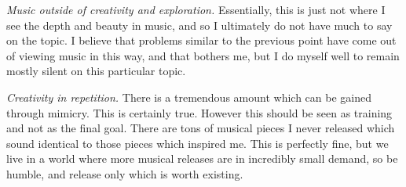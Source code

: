 \documentclass[12pt]{book}
\theoremstyle{plain}
\theoremstyle{definition}
\begin{document}
\emph{Music outside of creativity and exploration.} Essentially, this is just not where I see the depth and beauty in music, and so I ultimately do not have much to say on the topic. I believe that problems similar to the previous point have come out of viewing music in this way, and that bothers me, but I do myself well to remain mostly silent on this particular topic.

\emph{Creativity in repetition.} There is a tremendous amount which can be gained through mimicry. This is certainly true. However this should be seen as training and not as the final goal. There are tons of musical pieces I never released which sound identical to those pieces which inspired me. This is perfectly fine, but we live in a world where more musical releases are in incredibly small demand, so be humble, and release only which is worth existing.
\end{document}
